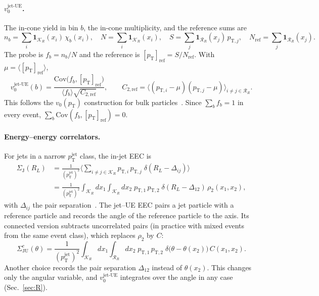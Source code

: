 \documentclass[11pt,a4paper]{article}
\newcommand{\pT}{p_\mathrm{T}}
\newcommand{\vjet}{v_0^{\mathrm{jet\text{-}UE}}}
\newcommand{\mpt}{[\pT]_\mathrm{ref}}
\newcommand{\Ctwo}{C_{2,\mathrm{ref}}}
\newcommand{\K}{\mathcal{K}_R}
\newcommand{\Rr}{\mathcal{R}_R}
\newcommand{\Nref}{N_\mathrm{ref}}
\newcommand{\pjet}{p_\mathrm{T}^\mathrm{jet}}
\begin{document}
\paragraph{$\vjet$.}
The in-cone yield in bin $b$, the in-cone multiplicity, and the reference sums are
\begin{equation}
n_b=\sum_i \mathbf{1}_{\K}(x_i)\,\chi_b(x_i),\quad N=\sum_i\mathbf{1}_{\K}(x_i),\quad
S=\sum_j \mathbf{1}_{\Rr}(x_j)\,p_{\mathrm{T},j},\quad \Nref=\sum_j\mathbf{1}_{\Rr}(x_j).
\end{equation}
The probe is $f_b=n_b/N$ and the reference is $\mpt=S/\Nref$. With $\mu=\langle\mpt\rangle$,
\begin{equation}
\vjet(b)=\frac{\mathrm{Cov}\big(f_b,\mpt\big)}{\langle f_b\rangle\sqrt{\Ctwo}},\qquad
\Ctwo=\big\langle (p_{\mathrm{T},i}-\mu)(p_{\mathrm{T},j}-\mu)\big\rangle_{i\neq j\in\Rr}.
\label{eq:v0}
\end{equation}
This follows the $v_0(\pT)$ construction for bulk particles~\cite{Schenke:2020uqq,ATLAS:2025v0pt,ALICE:2025v0pt}. Since $\sum_b f_b=1$ in every event, $\sum_b\mathrm{Cov}(f_b,\mpt)=0$.

\paragraph{Energy--energy correlators.}
For jets in a narrow $\pjet$ class, the in-jet EEC is
\begin{align}
\Sigma_\mathrm{J}(R_L)&=\frac{1}{(\pjet)^2}\Big\langle\sum_{i\neq j\in\K}p_{\mathrm{T},i}\,p_{\mathrm{T},j}\;\delta(R_L-\Delta_{ij})\Big\rangle\nonumber\\
&=\frac{1}{(\pjet)^2}\int_{\K}\!dx_1\!\int_{\K}\!dx_2\;p_{\mathrm{T},1}\,p_{\mathrm{T},2}\;\delta(R_L-\Delta_{12})\,\rho_2(x_1,x_2),
\label{eq:eecJ}
\end{align}
with $\Delta_{ij}$ the pair separation~\cite{Basham:1978bw,Andres:2022ovj}. The jet--UE EEC pairs a jet particle with a reference particle and records the angle of the reference particle to the axis. Its connected version subtracts uncorrelated pairs (in practice with mixed events from the same event class), which replaces $\rho_2$ by $C$:
\begin{equation}
\Sigma^{c}_\mathrm{JU}(\theta)=\frac{1}{(\pjet)^2}\int_{\K}\!dx_1\!\int_{\Rr}\!dx_2\;p_{\mathrm{T},1}\,p_{\mathrm{T},2}\;\delta\big(\theta-\theta(x_2)\big)\,C(x_1,x_2).
\label{eq:eecJU}
\end{equation}
Another choice records the pair separation $\Delta_{12}$ instead of $\theta(x_2)$. This changes only the angular variable, and $\vjet$ integrates over the angle in any case (Sec.~\ref{sec:R}).
\end{document}
